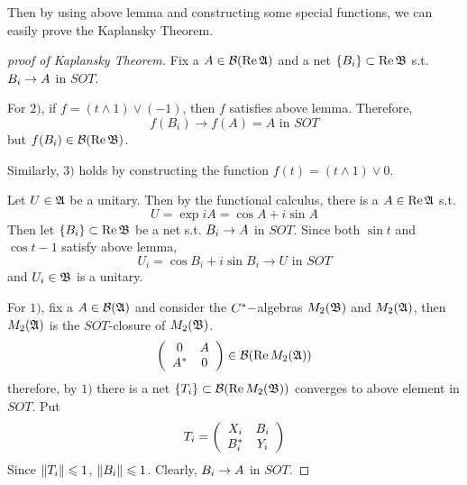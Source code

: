 Then by using above lemma and constructing some special functions, we can easily prove the Kaplansky Theorem.

\begin{proof}[proof of Kaplansky Theorem]
	Fix a $A \in \mathcal{B}(\operatorname{Re}{\mathfrak{A}})$ and a net $\{B_i\} \subset \operatorname{Re}{\mathfrak{B}}$ s.t. $B_i \rightarrow A$ in $SOT$.
	\item For $2)$, if $f = (t \wedge 1) \vee (-1)$, then $f$ satisfies above lemma. Therefore,
	\begin{equation*}
		f(B_i) \longrightarrow f(A) =  A \text{ in } SOT
	\end{equation*}
	but $f(B_i) \in \mathcal{B}(\operatorname{Re}{\mathfrak{B}})$.
	\item Similarly, $3)$ holds by constructing the function $f(t) = (t \wedge 1) \vee 0$.
	\item Let $U \in \mathfrak{A}$ be a unitary. Then by the functional calculus, there is a $A \in \operatorname{Re}{\mathfrak{A}}$ s.t.
	\begin{equation*}
		U = \exp{i A} = \cos{A} + i \sin{A}
	\end{equation*}
	Then let $\{B_i\} \subset \operatorname{Re}{\mathfrak{B}}$ be a net s.t. $B_i \rightarrow A$ in $SOT$. Since both $\sin{t}$ and $\cos{t} - 1$  satisfy above lemma, 
	\begin{equation*}
		U_i =  \cos{B_i} + i \sin{B_i} \longrightarrow U \text{ in } SOT
	\end{equation*}
	and $U_i \in \mathfrak{B}$ is a unitary.
	\item For $1)$, fix a $A \in \mathcal{B}(\mathfrak{A})$ and consider the $C^{*}-$algebras $M_2(\mathfrak{B})$ and $M_2(\mathfrak{A})$, then $M_2(\mathfrak{A})$ is the $SOT$-closure of $M_2(\mathfrak{B})$.
	\begin{equation*}
		\left(
			\begin{array}{cc}
				0 & A \\
				A^{*} & 0
			\end{array}
		\right)
		\in \mathcal{B}(\operatorname{Re}{M_2(\mathfrak{A})})
	\end{equation*}
	therefore, by $1)$ there is a net $\{T_i\} \subset \mathcal{B}(\operatorname{Re}{M_2(\mathfrak{B})})$ converges to above element in $SOT$. Put
	\begin{equation*}
		T_i = \left(
			\begin{array}{cc}
				X_i & B_i \\
				B^{*}_i & Y_i
			\end{array}
		\right)
	\end{equation*}
	Since $\left\lVert T_i\right\lVert \leqslant 1$, $\left\lVert B_i\right\lVert \leqslant 1$. Clearly, $B_i \rightarrow A$  in $SOT$.
\end{proof}

